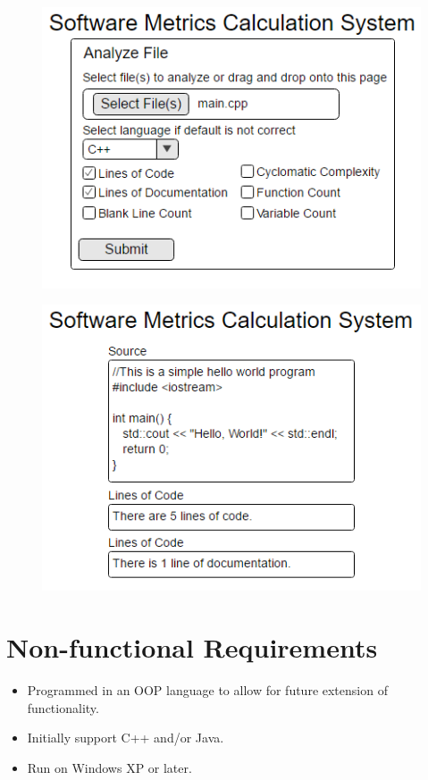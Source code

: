 \documentclass{scrreprt}
\begin{document}
	\begin{figure}[h]
		\centering
		\begin{minipage}{.5\textwidth}
			\centering
			\includegraphics[width=1\linewidth]{user-interface1.png}
			\label{fig:test1}
		\end{minipage}%
		\begin{minipage}{.5\textwidth}
			\centering
			\includegraphics[width=1\linewidth]{user-interface2.png}
			\label{fig:test2}
		\end{minipage}
	\end{figure}
	
	\section{Non-functional Requirements}
	\begin{itemize}
		\item Programmed in an OOP language to allow for future extension of functionality.
		\item Initially support C++ and/or Java.
		\item Run on Windows XP or later.
	\end{itemize}
\end{document}
